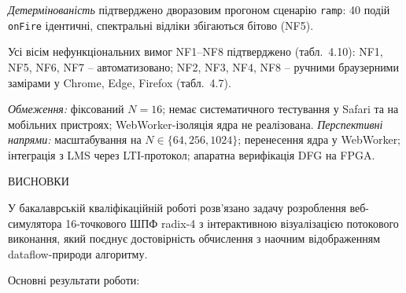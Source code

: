 \documentclass[
]{article}
\newcommand{\passthrough}[1]{#1}
\begin{document}
\emph{Детермінованість} підтверджено дворазовим прогоном сценарію
\passthrough{\lstinline!ramp!}: 40 подій
\passthrough{\lstinline!onFire!} ідентичні, спектральні відліки
збігаються бітово (NF5).

Усі вісім нефункціональних вимог NF1--NF8 підтверджено (табл.~4.10):
NF1, NF5, NF6, NF7 -- автоматизовано; NF2, NF3, NF4, NF8 -- ручними
браузерними замірами у Chrome, Edge, Firefox (табл.~4.7).

\emph{Обмеження:} фіксований \(N = 16\); немає систематичного тестування
у Safari та на мобільних пристроях; WebWorker-ізоляція ядра не
реалізована. \emph{Перспективні напрями:} масштабування на
\(N \in \{ 64,256,1024\}\); перенесення ядра у WebWorker; інтеграція з
LMS через LTI-протокол; апаратна верифікація DFG на FPGA.

\protect{}\label{_Toc230737409}{}ВИСНОВКИ

У бакалаврській кваліфікаційній роботі розв'язано задачу розроблення
веб-симулятора 16-точкового ШПФ radix-4 з інтерактивною візуалізацією
потокового виконання, який поєднує достовірність обчислення з наочним
відображенням dataflow-природи алгоритму.

Основні результати роботи:
\end{document}
